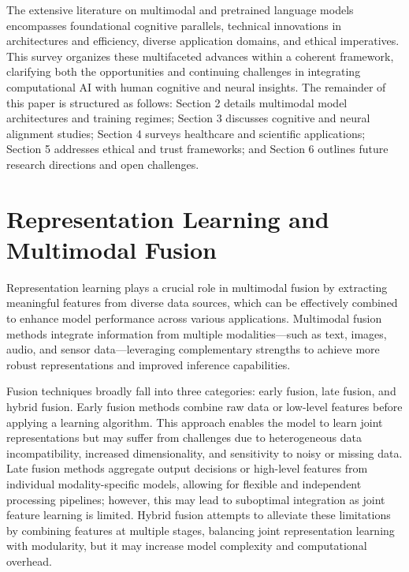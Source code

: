\documentclass[sigconf]{acmart}
\begin{document}
The extensive literature on multimodal and pretrained language models encompasses foundational cognitive parallels, technical innovations in architectures and efficiency, diverse application domains, and ethical imperatives. This survey organizes these multifaceted advances within a coherent framework, clarifying both the opportunities and continuing challenges in integrating computational AI with human cognitive and neural insights. The remainder of this paper is structured as follows: Section 2 details multimodal model architectures and training regimes; Section 3 discusses cognitive and neural alignment studies; Section 4 surveys healthcare and scientific applications; Section 5 addresses ethical and trust frameworks; and Section 6 outlines future research directions and open challenges.

\section{Representation Learning and Multimodal Fusion}

Representation learning plays a crucial role in multimodal fusion by extracting meaningful features from diverse data sources, which can be effectively combined to enhance model performance across various applications. Multimodal fusion methods integrate information from multiple modalities—such as text, images, audio, and sensor data—leveraging complementary strengths to achieve more robust representations and improved inference capabilities.

Fusion techniques broadly fall into three categories: early fusion, late fusion, and hybrid fusion. Early fusion methods combine raw data or low-level features before applying a learning algorithm. This approach enables the model to learn joint representations but may suffer from challenges due to heterogeneous data incompatibility, increased dimensionality, and sensitivity to noisy or missing data. Late fusion methods aggregate output decisions or high-level features from individual modality-specific models, allowing for flexible and independent processing pipelines; however, this may lead to suboptimal integration as joint feature learning is limited. Hybrid fusion attempts to alleviate these limitations by combining features at multiple stages, balancing joint representation learning with modularity, but it may increase model complexity and computational overhead.
\end{document}
